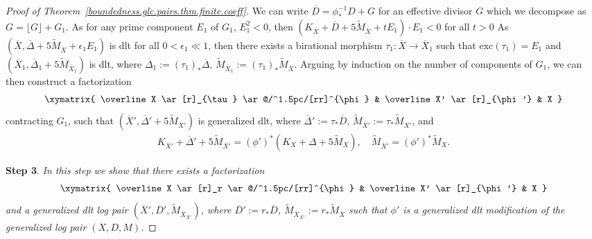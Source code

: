 \documentclass[12pt, a4paper]{amsart}
\newcounter{Theorem}
\theoremstyle{definition}
\theoremstyle{named}
\begin{document}
\begin{proof}[Proof of Theorem~\ref{boundedness.glc.pairs.thm.finite.coeff}]
We can write 
$\overline D=\phi_\ast^{-1}D + G$ 
for an effective divisor 
$G$
which we decompose as
$G=\lfloor G \rfloor + G_1$.
As for any prime component 
$E_1$
of 
$G_1$, 
$E_1^2 < 0$,
then  
$(K_{\overline X}+ \overline D+ 5\widetilde{M}_{\overline X} + t E_1) \cdot E_1 < 0 $
for all
$t>0$
As 
$(\overline X,  \overline \Delta+ 5\widetilde{M}_{\overline X} + \epsilon_1 E_1)$
is dlt for all 
$0< \epsilon_1 \ll 1$, 
then there exists a birational morphism 
$\tau_1 \colon \overline X \to \overline X_1$
such that 
$\mathrm{exc}(\tau_1)=E_1$ 
and 
$(\overline X_1,  \overline \Delta_1+ 5\widetilde{M}_{\overline X_1})$ is dlt, 
where 
$\overline \Delta_1 := (\tau_1)_\ast \overline \Delta$, 
$\widetilde{M}_{\overline X_1} := (\tau_1)_\ast \widetilde{M}_{\overline X}$.
Arguing by induction on the number of components of $G_1$, 
we can then construct a factorization 
\begin{align}
\label{diag.gdlt.mod}
    \xymatrix{
 \overline X
    \ar[r]_{\tau}
    \ar@/^1.5pc/[rr]^{\phi}
    &
   \overline X'
    \ar[r]_{\phi'}
    &
    X
    }
\end{align}
contracting 
$G_1$,
such that 
$(\overline X', \overline \Delta' + 5\widetilde{M}_{\overline X'})$
is generalized dlt, where 
$\overline \Delta' := \tau_\ast \overline D$, 
$\widetilde{M}_{\overline X'} := \tau_\ast \widetilde{M}_{\overline X'}$, 
and 
\begin{align}
\label{eqn.dlt.mod.pullback.formula2}
 K_{\overline X'}+ \overline \Delta'+ 5\widetilde{M}_{\overline X'}
=
(\phi')^\ast
(K_X+\Delta+5\widetilde{M}_X), 
\quad 
\widetilde{M}_{\overline X'}=(\phi')^\ast \widetilde{M}_X.   
\end{align}



\medskip

\iffalse
{\bf Step 3}.
{\it In this step we show that there exists a factorization
\begin{align*}
    \xymatrix{
   \overline X
    \ar[r]_r
    \ar@/^1.5pc/[rr]^{\phi}
    &
   \overline X'
    \ar[r]_{\phi'}
    &
    X
    }
\end{align*}
and a generalized dlt log pair
$(\overline X', \overline{D}', \widetilde{M}_{\overline X}_{X'})$, 
where
$\overline D':=r_\ast \overline D$, 
$\widetilde{M}_{\overline X}_{X'}:=r_\ast \widetilde{M}_{\overline X}$
such that 
$\phi'$
is a generalized dlt modification of the generalized log pair 
$(X, D, M)$.}


\end{proof}
\end{document}

